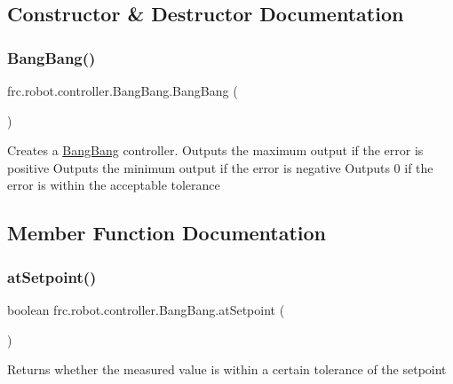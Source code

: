 \subsection{Constructor \& Destructor Documentation}
\mbox{\label{classfrc_1_1robot_1_1controller_1_1_bang_bang_a7461de01f9b1e5329584739591bdf7ae}} 
\subsubsection{\texorpdfstring{BangBang()}{BangBang()}}
{\footnotesize\ttfamily frc.\+robot.\+controller.\+Bang\+Bang.\+Bang\+Bang (\begin{DoxyParamCaption}{ }\end{DoxyParamCaption})\hspace{0.3cm}{\ttfamily [inline]}}

Creates a \mbox{\hyperlink{classfrc_1_1robot_1_1controller_1_1_bang_bang}{Bang\+Bang}} controller. Outputs the maximum output if the error is positive Outputs the minimum output if the error is negative Outputs 0 if the error is within the acceptable tolerance 

\subsection{Member Function Documentation}
\mbox{\label{classfrc_1_1robot_1_1controller_1_1_bang_bang_a58ac0677dcbaa8c8f8a609fa2f73867e}} 
\subsubsection{\texorpdfstring{atSetpoint()}{atSetpoint()}}
{\footnotesize\ttfamily boolean frc.\+robot.\+controller.\+Bang\+Bang.\+at\+Setpoint (\begin{DoxyParamCaption}{ }\end{DoxyParamCaption})\hspace{0.3cm}{\ttfamily [inline]}}

Returns whether the measured value is within a certain tolerance of the setpoint


